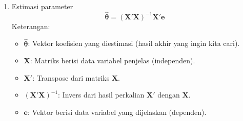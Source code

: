 \begin{enumerate}
\begin{enumerate}[label=\alph*)]
\begin{enumerate}[label=\roman*)]
            \item Estimasi parameter
            \begin{equation}\label{st_ma_parameter}
                \hat{\boldsymbol{\theta}} = \left( \mathbf{X}' \mathbf{X} \right)^{-1} \mathbf{X}' \mathbf{e}
            \end{equation}
            Keterangan:
            \begin{itemize}
                \item $\hat{\boldsymbol{\theta}}$: Vektor koefisien yang diestimasi (hasil akhir yang ingin kita cari).
                \item $\mathbf{X}$: Matriks berisi data variabel penjelas (independen).
                \item $\mathbf{X}'$: Transpose dari matriks $\mathbf{X}$.
                \item $(\mathbf{X}' \mathbf{X})^{-1}$: Invers dari hasil perkalian $\mathbf{X}'$ dengan $\mathbf{X}$.
                \item $\mathbf{e}$: Vektor berisi data variabel yang dijelaskan (dependen).
            \end{itemize}


\end{enumerate}
\end{enumerate}
\end{enumerate}
